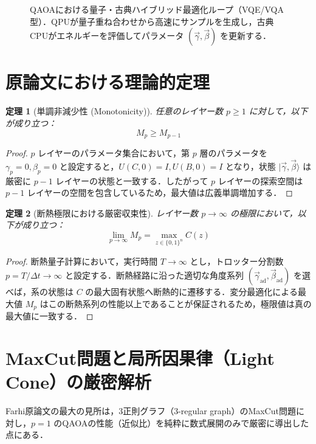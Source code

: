 \documentclass[11pt,a4paper,oneside,openany]{ltjsbook}
\theoremstyle{definition}
\theoremstyle{plain}
\newtheorem{theorem}{定理}[chapter]
\theoremstyle{remark}
\newcommand{\ket}[1]{|#1\rangle}
\begin{document}
\begin{figure}[htbp]
\caption{QAOAにおける量子・古典ハイブリッド最適化ループ（VQE/VQA型）．QPUが量子重ね合わせから高速にサンプルを生成し，古典CPUがエネルギーを評価してパラメータ $(\vec{\gamma}, \vec{\beta})$ を更新する．}
\label{fig:vqa_loop}
\end{figure}

\section{原論文における理論的定理}

\begin{theorem}[単調非減少性 (Monotonicity)]
任意のレイヤー数 $p \ge 1$ に対して，以下が成り立つ：
\begin{equation}
    M_p \ge M_{p-1}
\end{equation}
\end{theorem}
\begin{proof}
$p$ レイヤーのパラメータ集合において，第 $p$ 層のパラメータを $\gamma_p = 0, \beta_p = 0$ と設定すると，$U(C, 0) = I, U(B, 0) = I$ となり，状態 $\ket{\vec{\gamma}, \vec{\beta}}$ は厳密に $p-1$ レイヤーの状態と一致する．したがって $p$ レイヤーの探索空間は $p-1$ レイヤーの空間を包含しているため，最大値は広義単調増加する．
\end{proof}

\begin{theorem}[断熱極限における厳密収束性]
レイヤー数 $p \to \infty$ の極限において，以下が成り立つ：
\begin{equation}
    \lim_{p \to \infty} M_p = \max_{z \in \{0, 1\}^n} C(z)
\end{equation}
\end{theorem}
\begin{proof}
断熱量子計算において，実行時間 $T \to \infty$ とし，トロッター分割数 $p = T / \Delta t \to \infty$ と設定する．断熱経路に沿った適切な角度系列 $(\vec{\gamma}_{\text{ad}}, \vec{\beta}_{\text{ad}})$ を選べば，系の状態は $C$ の最大固有状態へ断熱的に遷移する．変分最適化による最大値 $M_p$ はこの断熱系列の性能以上であることが保証されるため，極限値は真の最大値に一致する．
\end{proof}

\section{MaxCut問題と局所因果律（Light Cone）の厳密解析}
Farhi原論文の最大の見所は，3正則グラフ（3-regular graph）のMaxCut問題に対し，$p=1$ のQAOAの性能（近似比）を純粋に数式展開のみで厳密に導出した点にある．
\end{document}
